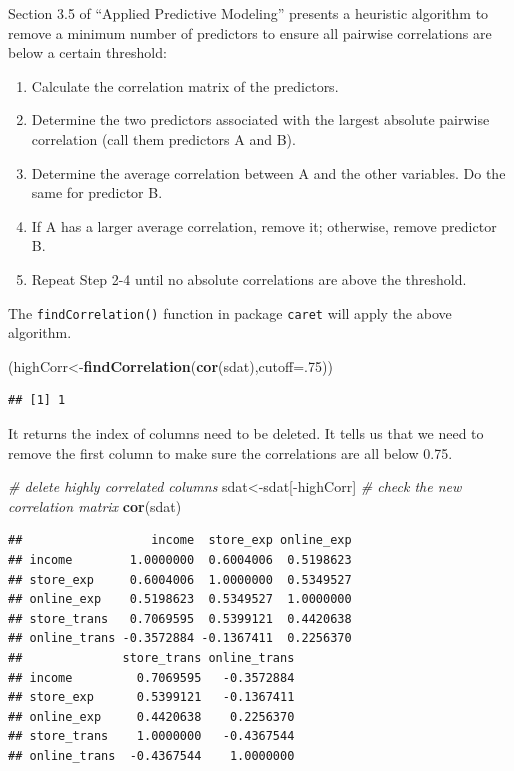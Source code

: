 \documentclass[12pt,]{krantz}
\newenvironment{Shaded}{\begin{snugshade}}{\end{snugshade}}
\newcommand{\KeywordTok}[1]{\textcolor[rgb]{0.13,0.29,0.53}{\textbf{{#1}}}}
\newcommand{\DataTypeTok}[1]{\textcolor[rgb]{0.13,0.29,0.53}{{#1}}}
\newcommand{\DecValTok}[1]{\textcolor[rgb]{0.00,0.00,0.81}{{#1}}}
\newcommand{\CommentTok}[1]{\textcolor[rgb]{0.56,0.35,0.01}{\textit{{#1}}}}
\newcommand{\NormalTok}[1]{{#1}}
\providecommand{\tightlist}{%
  \setlength{\itemsep}{0pt}\setlength{\parskip}{0pt}}
\renewenvironment{quote}{\begin{VF}}{\end{VF}}
\theoremstyle{definition}
\theoremstyle{definition}
\theoremstyle{remark}
\begin{document}
Section 3.5 of ``Applied Predictive Modeling'' \citep{APM} presents a
heuristic algorithm to remove a minimum number of predictors to ensure
all pairwise correlations are below a certain threshold:

\begin{quote}
\begin{enumerate}
\def\labelenumi{(\arabic{enumi})}
\tightlist
\item
  Calculate the correlation matrix of the predictors.
\item
  Determine the two predictors associated with the largest absolute
  pairwise correlation (call them predictors A and B).
\item
  Determine the average correlation between A and the other variables.
  Do the same for predictor B.
\item
  If A has a larger average correlation, remove it; otherwise, remove
  predictor B.
\item
  Repeat Step 2-4 until no absolute correlations are above the
  threshold.
\end{enumerate}
\end{quote}

The \texttt{findCorrelation()} function in package \texttt{caret} will
apply the above algorithm.

\begin{Shaded}
\begin{Highlighting}[]
\NormalTok{(highCorr<-}\KeywordTok{findCorrelation}\NormalTok{(}\KeywordTok{cor}\NormalTok{(sdat),}\DataTypeTok{cutoff=}\NormalTok{.}\DecValTok{75}\NormalTok{))}
\end{Highlighting}
\end{Shaded}

\begin{verbatim}
## [1] 1
\end{verbatim}

It returns the index of columns need to be deleted. It tells us that we
need to remove the first column to make sure the correlations are all
below 0.75.

\begin{Shaded}
\begin{Highlighting}[]
\CommentTok{# delete highly correlated columns}
\NormalTok{sdat<-sdat[-highCorr]}
\CommentTok{# check the new correlation matrix}
\KeywordTok{cor}\NormalTok{(sdat)}
\end{Highlighting}
\end{Shaded}

\begin{verbatim}
##                  income  store_exp online_exp
## income        1.0000000  0.6004006  0.5198623
## store_exp     0.6004006  1.0000000  0.5349527
## online_exp    0.5198623  0.5349527  1.0000000
## store_trans   0.7069595  0.5399121  0.4420638
## online_trans -0.3572884 -0.1367411  0.2256370
##              store_trans online_trans
## income         0.7069595   -0.3572884
## store_exp      0.5399121   -0.1367411
## online_exp     0.4420638    0.2256370
## store_trans    1.0000000   -0.4367544
## online_trans  -0.4367544    1.0000000
\end{verbatim}
\end{document}
